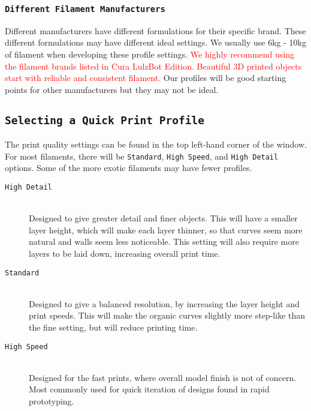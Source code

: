\subsubsection{\texttt{Different Filament Manufacturers}}
Different manufacturers have different formulations for their specific brand. These different formulations may have different ideal settings. We usually use 6kg - 10kg of filament when developing these profile settings. \textcolor{red}{We highly recommend using the filament brands listed in Cura LulzBot Edition. Beautiful 3D printed objects start with reliable and consistent filament.} Our profiles will be good starting points for other manufacturers but they may not be ideal.

\subsection{\texttt{Selecting a Quick Print Profile}}
The print quality settings can be found in the top left-hand corner of the window. For most filaments, there will be \texttt{Standard}, \texttt{High Speed}, and \texttt{High Detail} options. Some of the more exotic filaments may have fewer profiles.

\begin{description}
\item[\texttt{High Detail}] \hfill \\
Designed to give greater detail and finer objects. This will have a smaller layer height, which will make each layer thinner, so that curves seem more natural and walls seem less noticeable. This setting will also require more layers to be laid down, increasing overall print time.

\item[\texttt{Standard}] \hfill \\
Designed to give a balanced resolution, by increasing the layer height and print speeds. This will make the organic curves slightly more step-like than the fine setting, but will reduce printing time.

\item[\texttt{High Speed}] \hfill \\
Designed for the fast prints, where overall model finish is not of concern. Most commonly used for quick iteration of designs found in rapid prototyping.
\end{description}

